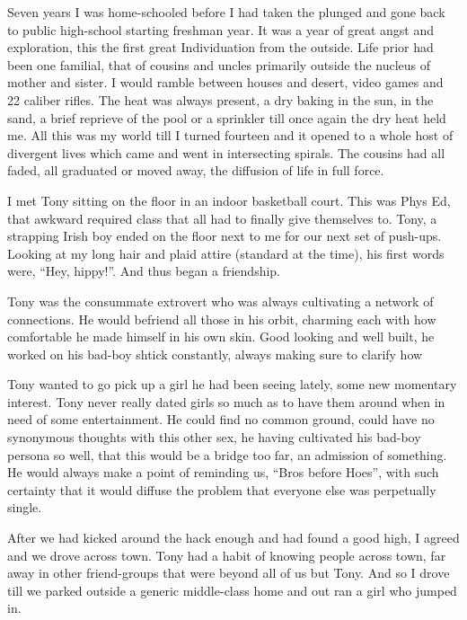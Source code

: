 \documentclass[ebook, 10pt, openright, onecolumn]{memoir}
\newcommand\td[1]{
  \todo[inline]{
     #1 
  }
}
\newcommand\finish{\td{ ----- Finish this section -----}}
\begin{document}
Seven years I was home-schooled before I had taken the plunged and gone back to
public high-school starting freshman year.  It was a year of great angst and
exploration, this the first great Individuation from the outside.  Life prior
had been one familial, that of cousins and uncles primarily outside the nucleus
of mother and sister.  I would ramble between houses and desert, video games and
22 caliber rifles.  The heat was always present, a dry baking in the sun, in the
sand, a brief reprieve of the pool or a sprinkler till once again the dry heat
held me.  All this was my world till I turned fourteen and it opened to a whole
host of divergent lives which came and went in intersecting spirals.  The
cousins had all faded, all graduated or moved away, the diffusion of life in
full force.

I met Tony sitting on the floor in an indoor basketball court.  This was Phys
Ed, that awkward required class that all had to finally give themselves to.
Tony, a strapping Irish boy ended on the floor next to me for our next set of
push-ups.  Looking at my long hair and plaid attire (standard at the time), his
first words were, ``Hey, hippy!''.  And thus began a friendship.

Tony was the consummate extrovert who was always cultivating a network of
connections.  He would befriend all those in his orbit, charming each with how
comfortable he made himself in his own skin.  Good looking and well built, he
worked on his bad-boy shtick constantly, always making sure to clarify how 

\finish

Tony wanted to go pick up a girl he had been seeing lately, some new momentary
interest.  Tony never really dated girls so much as to have them around when in
need of some entertainment.  He could find no common ground, could have no
synonymous thoughts with this other sex, he having cultivated his bad-boy
persona so well, that this would be a bridge too far, an admission of something.
He would always make a point of reminding us, ``Bros before Hoes'', with such
certainty that it would diffuse the problem that everyone else was perpetually
single.  

After we had kicked around the hack enough and had found a good high, I
agreed and we drove across town.  Tony had a habit of knowing people across
town, far away in other friend-groups that were beyond all of us but Tony.  And
so I drove till we parked outside a generic middle-class home and out ran a girl
who jumped in.
\end{document}
